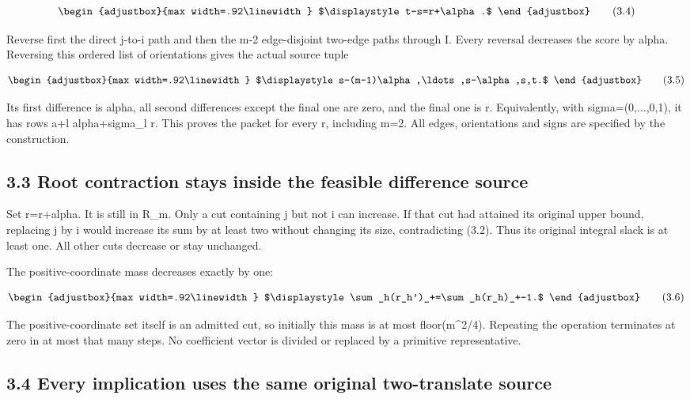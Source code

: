 \[
\begin{adjustbox}{max width=.92\linewidth}
$\displaystyle t-s=r+\alpha.$
\end{adjustbox}
\tag{3.4}
\]

Reverse first the direct j-to-i path and then the m-2 edge-disjoint two-edge paths through I. Every reversal decreases the score by alpha. Reversing this ordered list of orientations gives the actual source tuple

\[
\begin{adjustbox}{max width=.92\linewidth}
$\displaystyle s-(m-1)\alpha,\ldots,s-\alpha,s,t.$
\end{adjustbox}
\tag{3.5}
\]

Its first difference is alpha, all second differences except the final one are zero, and the final one is r. Equivalently, with sigma=(0,...,0,1), it has rows a+l alpha+sigma\_l r. This proves the packet for every r, including m=2. All edges, orientations and signs are specified by the construction.

\subsection{3.3 Root contraction stays inside the feasible difference source}\label{n18-root-contraction-stays-inside-the-feasible-difference-source}

Set r\textquotesingle=r+alpha. It is still in R\_m. Only a cut containing j but not i can increase. If that cut had attained its original upper bound, replacing j by i would increase its sum by at least two without changing its size, contradicting (3.2). Thus its original integral slack is at least one. All other cuts decrease or stay unchanged.

The positive-coordinate mass decreases exactly by one:

\[
\begin{adjustbox}{max width=.92\linewidth}
$\displaystyle \sum_h(r_h')_+=\sum_h(r_h)_+-1.$
\end{adjustbox}
\tag{3.6}
\]

The positive-coordinate set itself is an admitted cut, so initially this mass is at most floor(m\^{}2/4). Repeating the operation terminates at zero in at most that many steps. No coefficient vector is divided or replaced by a primitive representative.

\subsection{3.4 Every implication uses the same original two-translate source}\label{n18-every-implication-uses-the-same-original-two-translate-source}

